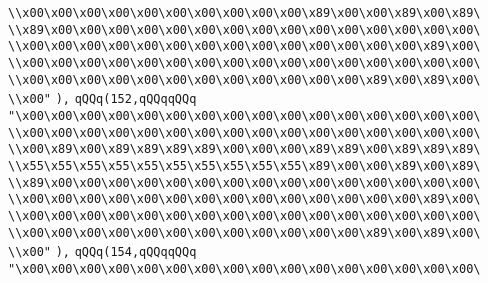 \verb|\\x00\x00\x00\x00\x00\x00\x00\x00\x00\x00\x89\x00\x00\x89\x00\x89\|\newline
\verb|\\x89\x00\x00\x00\x00\x00\x00\x00\x00\x00\x00\x00\x00\x00\x00\x00\|\newline
\verb|\\x00\x00\x00\x00\x00\x00\x00\x00\x00\x00\x00\x00\x00\x00\x89\x00\|\newline
\verb|\\x00\x00\x00\x00\x00\x00\x00\x00\x00\x00\x00\x00\x00\x00\x00\x00\|\newline
\verb|\\x00\x00\x00\x00\x00\x00\x00\x00\x00\x00\x00\x00\x89\x00\x89\x00\|\newline
\verb|\\x00"|\newline
\verb|),|\newline
\verb|qQQq(152,qQQqqQQq|\newline
\verb|"\x00\x00\x00\x00\x00\x00\x00\x00\x00\x00\x00\x00\x00\x00\x00\x00\|\newline
\verb|\\x00\x00\x00\x00\x00\x00\x00\x00\x00\x00\x00\x00\x00\x00\x00\x00\|\newline
\verb|\\x00\x89\x00\x89\x89\x89\x89\x00\x00\x00\x89\x89\x00\x89\x89\x89\|\newline
\verb|\\x55\x55\x55\x55\x55\x55\x55\x55\x55\x55\x89\x00\x00\x89\x00\x89\|\newline
\verb|\\x89\x00\x00\x00\x00\x00\x00\x00\x00\x00\x00\x00\x00\x00\x00\x00\|\newline
\verb|\\x00\x00\x00\x00\x00\x00\x00\x00\x00\x00\x00\x00\x00\x00\x89\x00\|\newline
\verb|\\x00\x00\x00\x00\x00\x00\x00\x00\x00\x00\x00\x00\x00\x00\x00\x00\|\newline
\verb|\\x00\x00\x00\x00\x00\x00\x00\x00\x00\x00\x00\x00\x89\x00\x89\x00\|\newline
\verb|\\x00"|\newline
\verb|),|\newline
\verb|qQQq(154,qQQqqQQq|\newline
\verb|"\x00\x00\x00\x00\x00\x00\x00\x00\x00\x00\x00\x00\x00\x00\x00\x00\|\newline
